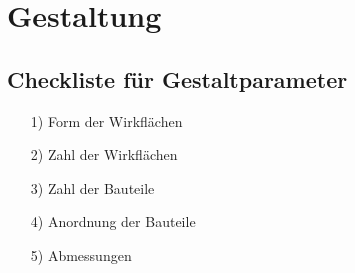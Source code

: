 \section{Gestaltung}


\subsection*{Checkliste für Gestaltparameter}

\begin{itemize}
	\item[1)] Form der Wirkflächen
	\item[2)] Zahl der Wirkflächen
	\item[3)] Zahl der Bauteile
	\item[4)] Anordnung der Bauteile
	\item[5)] Abmessungen	
\end{itemize}




























